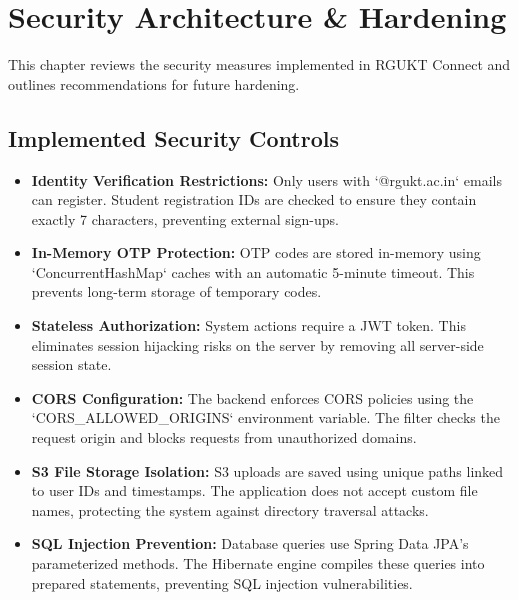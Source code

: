 \chapter{Security Architecture \& Hardening}
\label{ch:security}

This chapter reviews the security measures implemented in RGUKT Connect and outlines recommendations for future hardening.

\section{Implemented Security Controls}
\begin{itemize}
    \item \textbf{Identity Verification Restrictions:} Only users with `@rgukt.ac.in` emails can register. Student registration IDs are checked to ensure they contain exactly 7 characters, preventing external sign-ups.
    \item \textbf{In-Memory OTP Protection:} OTP codes are stored in-memory using `ConcurrentHashMap` caches with an automatic 5-minute timeout. This prevents long-term storage of temporary codes.
    \item \textbf{Stateless Authorization:} System actions require a JWT token. This eliminates session hijacking risks on the server by removing all server-side session state.
    \item \textbf{CORS Configuration:} The backend enforces CORS policies using the `CORS\_ALLOWED\_ORIGINS` environment variable. The filter checks the request origin and blocks requests from unauthorized domains.
    \item \textbf{S3 File Storage Isolation:} S3 uploads are saved using unique paths linked to user IDs and timestamps. The application does not accept custom file names, protecting the system against directory traversal attacks.
    \item \textbf{SQL Injection Prevention:} Database queries use Spring Data JPA's parameterized methods. The Hibernate engine compiles these queries into prepared statements, preventing SQL injection vulnerabilities.
\end{itemize}

